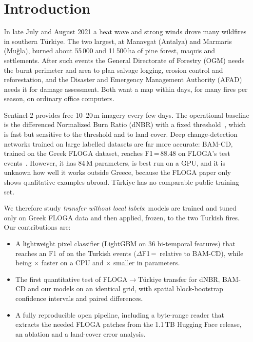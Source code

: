 \section{Introduction}\label{sec:intro}
In late July and August 2021 a heat wave and strong winds drove many wildfires in southern Türkiye. The two
largest, at Manavgat (Antalya) and Marmaris (Mu\u{g}la), burned about 55\,000 and 11\,500\,ha of pine forest,
maquis and settlements. After such events the General Directorate of Forestry (OGM) needs the burnt perimeter and
area to plan salvage logging, erosion control and reforestation, and the Disaster and Emergency Management Authority
(AFAD) needs it for damage assessment. Both want a map within days, for many fires per season, on ordinary
office computers.

Sentinel-2 provides free 10--20\,m imagery every few days. The operational baseline is the differenced
Normalized Burn Ratio (dNBR) with a fixed threshold~\cite{key2006landscape}, which is fast but sensitive to the
threshold and to land cover. Deep change-detection networks trained on large labelled datasets are far more
accurate: BAM-CD, trained on the Greek FLOGA dataset, reaches F1\,=\,88.48 on FLOGA's test events~\cite{sdraka2024floga}.
However, it has 84\,M parameters, is best run on a GPU, and it is unknown how well it works outside Greece, because
the FLOGA paper only shows qualitative examples abroad. Türkiye has no comparable public training set.

We therefore study \emph{transfer without local labels}: models are trained and tuned only on Greek FLOGA data and
then applied, frozen, to the two Turkish fires. Our contributions are:
\begin{itemize}
\item A lightweight pixel classifier (LightGBM on 36 bi-temporal features) that reaches an F1 of
\FoneLgbmPooled{} on the Turkish events ($\Delta$F1\,=\,\DeltaLgbmBamcdOnePooled{} relative to BAM-CD), while being
\SpeedupCpuLgbmBamcd$\times$ faster on a CPU and \ParamRatioBamcdLgbm$\times$ smaller in parameters.
\item The first quantitative test of FLOGA$\rightarrow$Türkiye transfer for dNBR, BAM-CD and our models on an
identical grid, with spatial block-bootstrap confidence intervals and paired differences.
\item A fully reproducible open pipeline, including a byte-range reader that extracts the needed FLOGA patches
from the 1.1\,TB Hugging Face release, an ablation and a land-cover error analysis.
\end{itemize}

